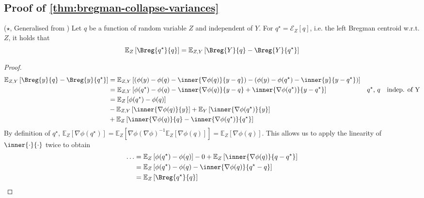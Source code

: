 \documentclass[
	twoside=false, %
]{kaobook}
\begin{document}
\subsection{Proof of \cref{thm:bregman-collapse-variances}}
\label{proof:bregman-collapse-variances}
\begin{lemma}  ($\star$, Generalised from \cite{wood_UnifiedTheoryDiversity_2023})
Let $q$ be a function of random variable $Z$ and independent of $Y$. For $q^\star = \mathcal{E}_{Z}\left[ q \right]$, i.e. the left Bregman centroid w.r.t. $Z$, it holds that
$$
\mathbb{E}_{Z}\left[ \Breg{q^\star}{q} \right] 
 = \mathbb{E}_{Z,Y}\left[ \Breg{Y}{q} - \Breg{Y}{q^\star} \right] 
$$
\end{lemma}
\begin{proof}
\begin{align*}
    \mathbb{E}_{Z,Y}\left[ \Breg{y}{q} - \Breg{y}{q^\star} \right]  
    &= \mathbb{E}_{Z,Y}\left[ (\phi(y) - \phi(q) - \inner{\nabla \phi(q)}{y-q}) - (\phi(y) - \phi(q^\star) - \inner{y}{y - q^\star}) \right]  \\
    &= \mathbb{E}_{Z,Y}\left[ \phi(q^\star) - \phi(q) - \inner{\nabla \phi(q)}{y-q} + \inner{\nabla \phi(q^\star)}{y-q^\star}\right]  & \text{$q^\star$, $q$ ~~indep. of Y} \\ 
    &= \mathbb{E}_{Z}\left[  \phi(q^\star) - \phi(q) \right]  \\
    &- \mathbb{E}_{Z,Y}\left[ \inner{\nabla \phi(q)}{y}\right]  + \mathbb{E}_{Y}\left[ \inner{\nabla \phi(q^\star)}{y} \right] \\
    &+ \mathbb{E}_{Z}\left[ \inner{\nabla \phi(q)}{q} - \inner{\nabla \phi(q^\star)}{q^\star} \right] 
\end{align*}
By definition of $q^\star$, $\mathbb{E}_{Z}\left[ \nabla \phi(q^\star) \right] = \mathbb{E}_{Z}\left[ \nabla \phi (\nabla \phi)^{-1} \mathbb{E}_{Z}\left[ \nabla \phi(q) \right] \right] = \mathbb{E}_{Z}\left[ \nabla \phi(q) \right]$. This allows us to apply the linearity of $\inner{\cdot}{\cdot}$ twice to obtain
\begin{align*}
    \dots &= \mathbb{E}_{Z}\left[ \phi(q^\star) - \phi(q) \right]  - 0 + \mathbb{E}_{Z}\left[ \inner{\nabla \phi(q)}{q-q^\star} \right]  \\
    &= \mathbb{E}_{Z}\left[ \phi(q^\star) - \phi(q)  - \inner{\nabla \phi(q)}{q^\star - q}\right]  \\
    &= \mathbb{E}_{Z}\left[ \Breg{q^\star}{q} \right] 
\end{align*}
\end{proof}
\end{document}
